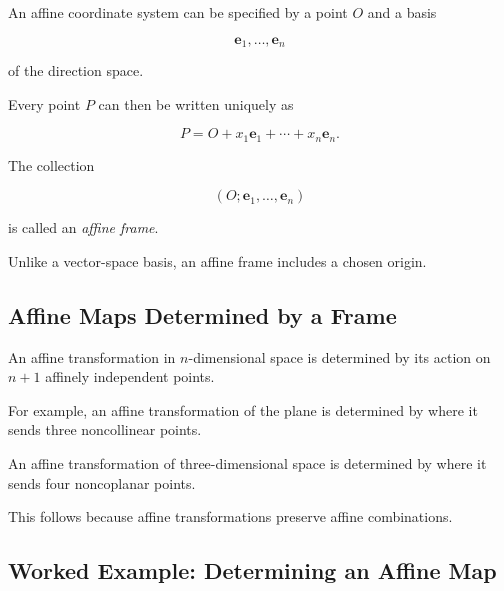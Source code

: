 An affine coordinate system can be specified by a point \(O\) and a basis

\[ \mathbf{e}_1,\ldots,\mathbf{e}_n \]

of the direction space.

Every point \(P\) can then be written uniquely as

\[
\boxed{
P=O+x_1\mathbf{e}_1+\cdots+x_n\mathbf{e}_n.
}
\]

The collection

\[ (O;\mathbf{e}_1,\ldots,\mathbf{e}_n) \]

is called an \emph{affine frame}.

Unlike a vector-space basis, an affine frame includes a chosen origin.

\subsection{Affine Maps Determined by a Frame}
\label{subsec:affine-map-frame}

An affine transformation in \(n\)-dimensional space is determined by its
action on \(n+1\) affinely independent points.

For example, an affine transformation of the plane is determined by where it
sends three noncollinear points.

An affine transformation of three-dimensional space is determined by where
it sends four noncoplanar points.

This follows because affine transformations preserve affine combinations.

\subsection{Worked Example: Determining an Affine Map}
\label{subsec:worked-determine-affine-map}

